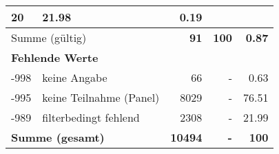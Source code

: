\begin{longtable}{lXrrr}
       \num{20} &
       \num[round-mode=places,round-precision=2]{21,98} &
         \num[round-mode=places,round-precision=2]{0,19} \\
     \midrule
     \multicolumn{2}{l}{Summe (gültig)} &
       \textbf{\num{91}} &
     \textbf{100} &
       \textbf{\num[round-mode=places,round-precision=2]{0,87}} \\
     \multicolumn{5}{l}{\textbf{Fehlende Werte}}\\
       -998 &
       keine Angabe &
         \num{66} &
        - &
         \num[round-mode=places,round-precision=2]{0,63} \\
       -995 &
       keine Teilnahme (Panel) &
         \num{8029} &
        - &
         \num[round-mode=places,round-precision=2]{76,51} \\
       -989 &
       filterbedingt fehlend &
         \num{2308} &
        - &
         \num[round-mode=places,round-precision=2]{21,99} \\
     \midrule
     \multicolumn{2}{l}{\textbf{Summe (gesamt)}} &
          \textbf{\num{10494}} &
        \textbf{-} &
        \textbf{100} \\
     \bottomrule
     \end{longtable}
     

